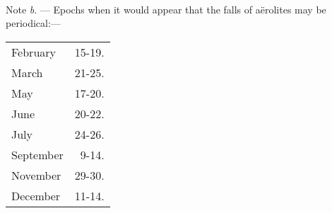 \documentclass[a4paper, 12pt, oneside]{article}
\begin{document}
\paragraph{}
Note \emph{b}. --- Epochs when it would appear that the falls of aërolites may be periodical:---
\begin{table}[!ht]
    \centering
    \Fontauri
    \begin{tabular}{l r}
        February & 15-19. \\
        March & 21-25. \\
        May & 17-20. \\
        June & 20-22. \\
        July & 24-26. \\
        September & 9-14. \\
        November & 29-30. \\
        December & 11-14. \\
    \end{tabular}
\end{table}
\clearpage
\end{document}
